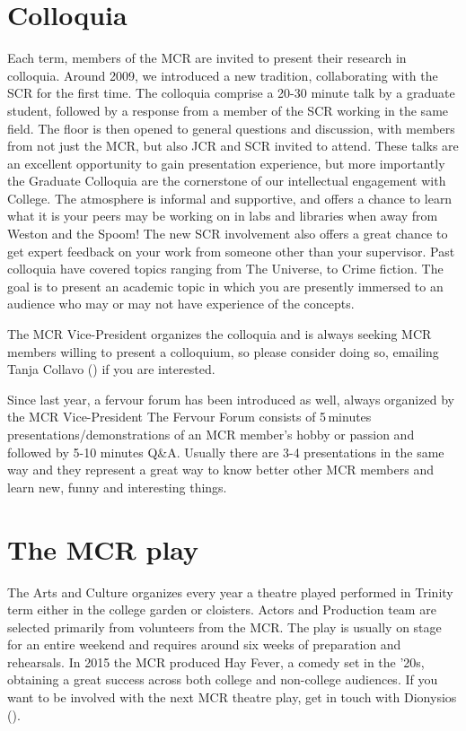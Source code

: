 \section{Colloquia}
Each term, members of the MCR are invited to present their research in colloquia. Around 2009, we introduced a new tradition, collaborating with the SCR for the first time. The colloquia comprise a 20-30 minute talk by a graduate student, followed by a response from a member of the SCR working in the same field. The floor is then opened to general questions and discussion, with members from not just the MCR, but also JCR and SCR invited to attend. These talks are an excellent opportunity to gain presentation experience, but more importantly the Graduate Colloquia are the cornerstone of our intellectual engagement with College. The atmosphere is informal and supportive, and offers a chance to learn what it is your peers may be working on in labs and libraries when away from Weston and the Spoom! The new SCR involvement also offers a great chance to get expert feedback on your work from someone other than your supervisor. Past colloquia have covered topics ranging from The Universe, to Crime fiction. The goal is to present an academic topic in which you are presently immersed to an audience who may or may not have experience of the concepts.

The MCR Vice-President organizes the colloquia and is always seeking MCR members
willing to present a colloquium, so please consider doing so, emailing Tanja
Collavo
(\href{mailto:tanja.collavo@new.ox.ac.uk}{})
if you are interested.

Since last year, a fervour forum has been introduced as well, always organized
by the MCR Vice-President The Fervour Forum consists of 5\,minutes
presentations/demonstrations of an MCR member's hobby or passion and followed by 5-10 minutes Q\&A. Usually there are 3-4 presentations in the same way and they represent a great way to know better other MCR members and learn new, funny and interesting things.

\section{The MCR play}
The Arts and Culture organizes every year a theatre played performed in Trinity
term either in the college garden or cloisters. Actors and Production team are
selected primarily from volunteers from the MCR. The play is usually on stage for an entire weekend and requires around six weeks of preparation and rehearsals. In 2015 the MCR produced Hay Fever, a comedy set in the '20s, obtaining a great success across both college and non-college audiences. If you want to be involved with the next MCR theatre play, get in touch with Dionysios (\href{mailto:dionysios.kyropoulos@music.ox.ac.uk}{}).


